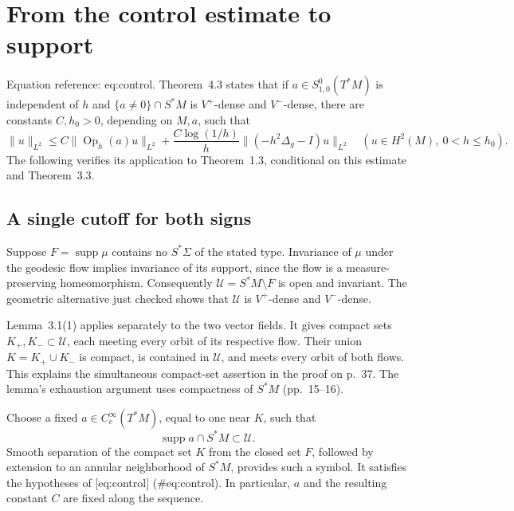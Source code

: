 \documentclass[10pt]{article}
\begin{document}
\section*{From the control estimate to support}
Equation reference: eq:control. Theorem 4.3 states that if \(a\in S^0_{1,0}(T^*M)\) is independent of \(h\) and \(\{a\ne0\}\cap S^*M\) is \(V^+\)-dense and \(V^-\)-dense, there are constants \(C,h_0>0\), depending on \(M,a\), such that \[
 \|u\|_{L^2}
 \le C\|\operatorname{Op}_h(a)u\|_{L^2}
   +\frac{C\log(1/h)}{h}\|(-h^2\Delta_g-I)u\|_{L^2}
 \quad (u\in H^2(M),\ 0<h\le h_0).\] The following verifies its application to Theorem 1.3, conditional on this estimate and Theorem 3.3.\par
\subsection*{A single cutoff for both signs}
Suppose \(F=\operatorname{supp}\mu\) contains no \(S^*\Sigma\) of the stated type. Invariance of \(\mu\) under the geodesic flow implies invariance of its support, since the flow is a measure-preserving homeomorphism. Consequently \(\mathcal U=S^*M\setminus F\) is open and invariant. The geometric alternative just checked shows that \(\mathcal U\) is \(V^+\)-dense and \(V^-\)-dense.\par
Lemma 3.1(1) applies separately to the two vector fields. It gives compact sets \(K_+,K_-\subset\mathcal U\), each meeting every orbit of its respective flow. Their union \(K=K_+\cup K_-\) is compact, is contained in \(\mathcal U\), and meets every orbit of both flows. This explains the simultaneous compact-set assertion in the proof on p. 37. The lemma’s exhaustion argument uses compactness of \(S^*M\) (pp. 15–16).\par
Choose a fixed \(a\in C_c^\infty(T^*M)\), equal to one near \(K\), such that \[\operatorname{supp}a\cap S^*M\subset\mathcal U.\] Smooth separation of the compact set \(K\) from the closed set \(F\), followed by extension to an annular neighborhood of \(S^*M\), provides such a symbol. It satisfies the hypotheses of [eq:control] (\#eq:control). In particular, \(a\) and the resulting constant \(C\) are fixed along the sequence.\par
\end{document}
